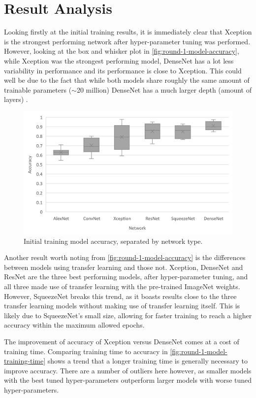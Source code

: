 \section{Result Analysis}
Looking firstly at the initial training results, it is immediately clear that Xception is the strongest performing network after hyper-parameter tuning was performed. However, looking at the box and whisker plot in \autoref{fig:round-1-model-accuracy}, while Xception was the strongest performing model, DenseNet has a lot less variability in performance and its performance is close to Xception. This could well be due to the fact that while both models share roughly the same amount of trainable parameters ($\sim$20 million) DenseNet has a much larger depth (amount of layers) \citep{KerasApp92:online}.

\begin{figure}[H]
    \centering
    \includegraphics[width=\textwidth]{figures/round-1-model-accuracy.png}
    \caption{Initial training model accuracy, separated by network type.}
    \label{fig:round-1-model-accuracy}
\end{figure}

Another result worth noting from \autoref{fig:round-1-model-accuracy} is the differences between models using transfer learning and those not. Xception, DenseNet and ResNet are the three best performing models, after hyper-parameter tuning, and all three made use of transfer learning with the pre-trained ImageNet weights. However, SqueezeNet breaks this trend, as it boasts results close to the three transfer learning models without making use of transfer learning itself. This is likely due to SqueezeNet's small size, allowing for faster training to reach a higher accuracy within the maximum allowed epochs.

The improvement of accuracy of Xception versus DenseNet comes at a cost of training time. Comparing training time to accuracy in \autoref{fig:round-1-model-training-time} shows a trend that a longer training time is generally necessary to improve accuracy. There are a number of outliers here however, as smaller models with the best tuned hyper-parameters outperform larger models with worse tuned hyper-parameters.

